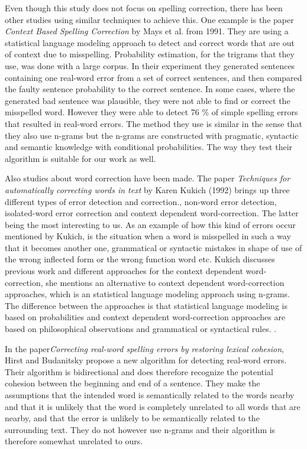 \documentclass[a4paper,12pt]{article}
\begin{document}
Even though this study does not focus on spelling correction, there has been other studies using similar techniques to achieve this. One example is the paper \emph{Context Based Spelling Correction} by Mays et al. from 1991. They are using a statistical language modeling approach to detect and correct words that are out of context due to misspelling.  Probability estimation, for the trigrams that they use, was done with a large corpus. In their experiment they generated sentences containing one real-word error from a set of correct sentences, and then compared the faulty sentence probability to the correct sentence. In some cases, where the generated bad sentence was plausible, they were not able to find or correct the misspelled word. However they were able to detect 76 \% of simple spelling errors that resulted in real-word errors. The method they use is similar in the sense that they also use n-grams but the n-grams are constructed with pragmatic, syntactic and semantic knowledge with conditional probabilities. The way they test their algorithm is suitable for our work as well.\cite{Mays1991}

Also studies about word correction have been made. The paper \emph{Techniques for automatically correcting words in text} by Karen Kukich (1992) brings up three different types of error detection and correction., non-word error detection, isolated-word error correction and context dependent word-correction. The latter being the most interesting to us. As an example of how this kind of errors occur mentioned by Kukich, is the situation when a word is misspelled in such a way that it becomes another one, grammatical or syntactic mistakes in shape of use of the wrong inflected form or the wrong function word etc. Kukich discusses previous work and different approaches for the context dependent word-correction, she mentions an alternative to context dependent word-correction approaches, which is an statistical language modeling approach using n-grams. The difference between the approaches is that statistical language modeling is based on probabilities and context dependent word-correction approaches are based on philosophical observations and grammatical or syntactical rules. \cite{Kukich1992Tecniques}.

In the paper\emph{Correcting real-word spelling errors by restoring lexical cohesion}, Hirst and Budanitsky propose a new algorithm for detecting real-word errors. Their algorithm is bidirectional and does therefore recognize the potential cohesion between the beginning and end of a sentence.  They make the assumptions that the intended word is semantically related to the words nearby and that it is unlikely that the word is completely unrelated to all words that are nearby, and that the error is unlikely to be semantically related to the surrounding text. They do not however use n-grams and their algorithm is therefore somewhat unrelated to ours. \cite{hirst}
\end{document}
